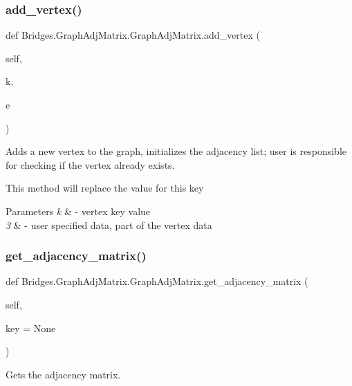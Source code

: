\subsubsection{\texorpdfstring{add\+\_\+vertex()}{add\_vertex()}}
{\footnotesize\ttfamily def Bridges.\+Graph\+Adj\+Matrix.\+Graph\+Adj\+Matrix.\+add\+\_\+vertex (\begin{DoxyParamCaption}\item[{}]{self,  }\item[{}]{k,  }\item[{}]{e }\end{DoxyParamCaption})}



Adds a new vertex to the graph, initializes the adjacency list; user is responsible for checking if the vertex already exists. 

This method will replace the value for this key


\begin{DoxyParams}{Parameters}
{\em k} & -\/ vertex key value \\
\hline
{\em 3} & -\/ user specified data, part of the vertex data \\
\hline
\end{DoxyParams}
\mbox{\label{class_bridges_1_1_graph_adj_matrix_1_1_graph_adj_matrix_aa3d184df6b73dd3692335b188addbbb9}} 
\subsubsection{\texorpdfstring{get\+\_\+adjacency\+\_\+matrix()}{get\_adjacency\_matrix()}}
{\footnotesize\ttfamily def Bridges.\+Graph\+Adj\+Matrix.\+Graph\+Adj\+Matrix.\+get\+\_\+adjacency\+\_\+matrix (\begin{DoxyParamCaption}\item[{}]{self,  }\item[{}]{key = {\ttfamily None} }\end{DoxyParamCaption})}



Gets the adjacency matrix. 

